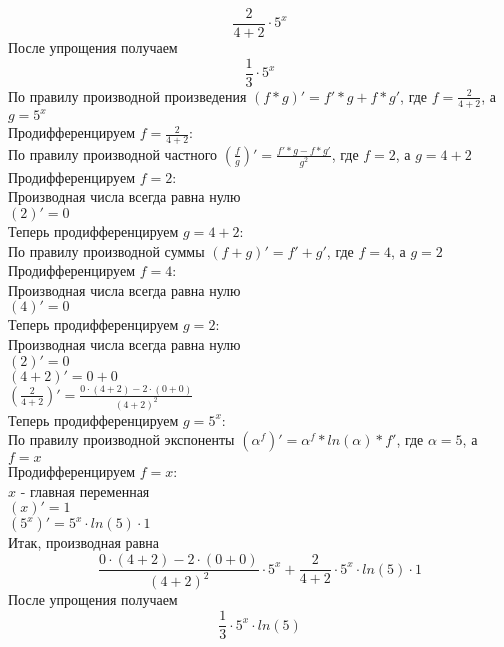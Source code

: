 \documentclass[12pt]{article}
\begin{document}
  $$\frac{2}{4 + 2} \cdot 5^{x}$$
После упрощения получаем
    $$\frac{1}{3} \cdot 5^{x}$$
По правилу производной произведения $\left(f * g\right)' = f' * g + f * g'$, где $f = \frac{2}{4 + 2}$, а $g = 5^{x}$\\
Продифференцируем $f = \frac{2}{4 + 2}$:\\По правилу производной частного $\left(\frac{f}{g}\right)' = \frac{f' * g - f * g'}{g ^ {2}}$, где $f = 2$, а $g = 4 + 2$\\
Продифференцируем $f = 2$:\\Производная числа всегда равна нулю\\$\left(2\right)' = 0$\\
Теперь продифференцируем $g = 4 + 2$:\\По правилу производной суммы $\left(f + g\right)' = f' + g'$, где $f = 4$, а $g = 2$\\
Продифференцируем $f = 4$:\\Производная числа всегда равна нулю\\$\left(4\right)' = 0$\\
Теперь продифференцируем $g = 2$:\\Производная числа всегда равна нулю\\$\left(2\right)' = 0$\\$\left(4 + 2\right)' = 0 + 0$\\$\left(\frac{2}{4 + 2}\right)' = \frac{0 \cdot \left(4 + 2\right) - 2 \cdot \left(0 + 0\right)}{\left(4 + 2\right)^{2}}$\\
Теперь продифференцируем $g = 5^{x}$:\\По правилу производной экспоненты $\left(\alpha ^ {f}\right)' = \alpha ^ {f} * ln\left(\alpha\right) * f'$, где $\alpha = 5$, а $f = x$\\
Продифференцируем $f = x$:\\$x$ - главная переменная\\$\left(x\right)' = 1$\\$\left(5^{x}\right)' = 5^{x} \cdot ln\left(5\right) \cdot 1$\\Итак, производная равна
    $$\frac{0 \cdot \left(4 + 2\right) - 2 \cdot \left(0 + 0\right)}{\left(4 + 2\right)^{2}} \cdot 5^{x} + \frac{2}{4 + 2} \cdot 5^{x} \cdot ln\left(5\right) \cdot 1$$
После упрощения получаем
    $$\frac{1}{3} \cdot 5^{x} \cdot ln\left(5\right)$$
\end{document}
